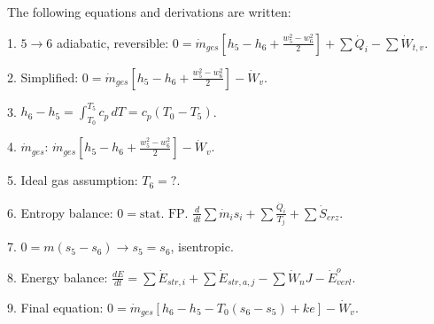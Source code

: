 The following equations and derivations are written:  

1. \( 5 \rightarrow 6 \) adiabatic, reversible:  
   \( 0 = \dot{m}_{ges} \left[ h_5 - h_6 + \frac{w_5^2 - w_6^2}{2} \right] + \sum \dot{Q}_i - \sum \dot{W}_{t,v} \).  

2. Simplified:  
   \( 0 = \dot{m}_{ges} \left[ h_5 - h_6 + \frac{w_5^2 - w_6^2}{2} \right] - \dot{W}_v \).  

3. \( h_6 - h_5 = \int_{T_0}^{T_5} c_p \, dT = c_p (T_0 - T_5) \).  

4. \( \dot{m}_{ges} \):  
   \( \dot{m}_{ges} \left[ h_5 - h_6 + \frac{w_5^2 - w_6^2}{2} \right] - \dot{W}_v \).  

5. Ideal gas assumption:  
   \( T_6 = ? \).  

6. Entropy balance:  
   \( 0 = \text{stat. FP} \).  
   \( \frac{d}{dt} \sum \dot{m}_i s_i + \sum \frac{\dot{Q}_i}{T_j} + \sum \dot{S}_{erz} \).  

7. \( 0 = m (s_5 - s_6) \rightarrow s_5 = s_6 \), isentropic.  

8. Energy balance:  
   \( \frac{dE}{dt} = \sum \dot{E}_{str,i} + \sum \dot{E}_{str,a,j} - \sum \dot{W}_n J - \dot{E}_{verl}^o \).  

9. Final equation:  
   \( 0 = \dot{m}_{ges} \left[ h_6 - h_5 - T_0 (s_6 - s_5) + ke \right] - \dot{W}_v \).